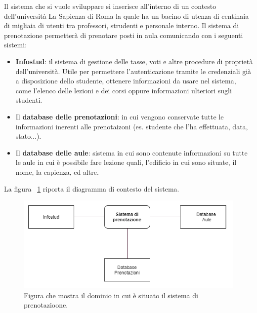 Il sistema che si vuole sviluppare si inserisce all’interno di un contesto dell’università La Sapienza di Roma  la quale ha un bacino di utenza di centinaia di migliaia di utenti tra professori, strudenti e personale interno. Il sistema di prenotazione permetterà di prenotare posti in aula comunicando con i seguenti sistemi:
\begin{itemize}
\item \textbf{Infostud}: il sistema di gestione delle tasse, voti e altre procedure di proprietà dell’università. Utile per permettere l’autenticazione tramite le credenziali già a disposizione dello studente, ottenere informazioni da usare nel sistema, come l’elenco delle lezioni e dei corsi oppure informazioni ulteriori sugli studenti.
\item Il \textbf{database delle prenotazioni}: in cui vengono conservate tutte le informazioni inerenti alle prenotaizoni (es. studente che l’ha effettuata, data, stato...).
\item Il \textbf{database delle aule}: sistema in cui sono contenute informazioni su tutte le aule in cui è possibile fare lezione quali, l’edificio in cui sono situate, il nome, la capienza, ed altre.
\end{itemize}
La figura ~\ref{figura: diagramma di contesto} riporta il diagramma di contesto  del sistema.	

\begin{figure}[htp]
\begin{center}
  \includegraphics[width=1 \textwidth]{Figure/diagramma di contesto.png}
    \caption{Figura che mostra il dominio in cui è situato il sistema di prenotazioone.} \label{figura: diagramma di contesto}
\end{center}
\end{figure}
